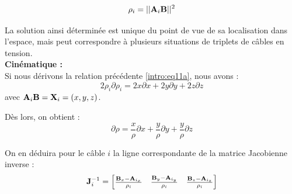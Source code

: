 \begin{equation}
\rho_i = ||{\bf A}_i{\bf B}||^2
\label{intro:eq11a}
\end{equation}

La solution ainsi d\'etermin\'ee est unique du point de vue de sa localisation 
dans l'espace, mais peut correspondre \`a plusieurs situations de triplets de 
c\^ables en tension.\\

{\bf Cin\'ematique :}\\

Si nous d\'erivons la relation pr\'ec\'edente \ref{intro:eq11a}, nous avons :
\begin{equation}
2 \rho_i \partial \rho_i = 2 x \partial x + 2 y \partial y + 2 z \partial z
\label{intro:eq11a2}
\end{equation}
avec ${\bf A}_i{\bf B} = {\bf X}_i = (x, y, z)$.

D\`es lors, on obtient :
\begin{equation}
\partial \rho = \frac x \rho \partial x + \frac y \rho \partial y + \frac y 
\rho \partial z
\label{intro:eq11a3}
\end{equation}

On en d\'eduira pour le c\^able $i$ la ligne correspondante de la 
matrice Jaco\-bienne inverse :
\begin{equation}
{\bf J}^{-1}_i = 
\begin{bmatrix}
\frac {{\bf B}_x - {\bf A}_{i_x}} {\rho_i} & \frac {{\bf B}_y - {\bf A}_{i_y}} 
{\rho_i} & \frac {{\bf B}_z - {\bf A}_{i_z}} {\rho_i} 
\end{bmatrix}
\label{intro:eq11a4}
\end{equation}




\vfill